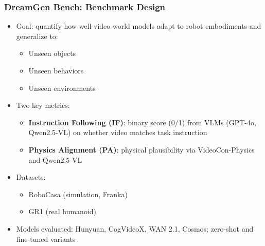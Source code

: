 \documentclass{beamer}
\begin{document}
\begin{frame}
  \frametitle{DreamGen Bench: Benchmark Design}
  \small
  \begin{itemize}
    \item Goal: quantify how well video world models adapt to robot embodiments and generalize to:
      \begin{itemize}
        \item Unseen objects
        \item Unseen behaviors
        \item Unseen environments
      \end{itemize}
    \item Two key metrics:
      \begin{itemize}
        \item \textbf{Instruction Following (IF)}: binary score (0/1) from VLMs (GPT-4o, Qwen2.5-VL) on whether video matches task instruction
        \item \textbf{Physics Alignment (PA)}: physical plausibility via VideoCon-Physics and Qwen2.5-VL
      \end{itemize}
    \item Datasets:
      \begin{itemize}
        \item RoboCasa (simulation, Franka)
        \item GR1 (real humanoid)
      \end{itemize}
    \item Models evaluated: Hunyuan, CogVideoX, WAN 2.1, Cosmos; zero-shot and fine-tuned variants
  \end{itemize}
\end{frame}
\end{document}
